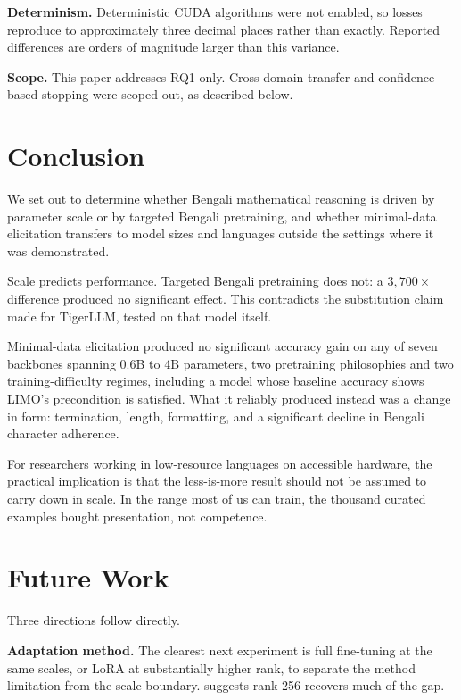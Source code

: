 \textbf{Determinism.} Deterministic CUDA algorithms were not enabled, so losses
reproduce to approximately three decimal places rather than exactly. Reported
differences are orders of magnitude larger than this variance.

\textbf{Scope.} This paper addresses RQ1 only. Cross-domain transfer and
confidence-based stopping were scoped out, as described below.


\section{Conclusion}

We set out to determine whether Bengali mathematical reasoning is driven by
parameter scale or by targeted Bengali pretraining, and whether minimal-data
elicitation transfers to model sizes and languages outside the settings where it
was demonstrated.

Scale predicts performance.  Targeted Bengali pretraining does not: a
$3{,}700\times$ difference produced no significant effect. This contradicts the
substitution claim made for TigerLLM, tested on that model itself.

Minimal-data elicitation produced no significant accuracy gain on any of seven
backbones spanning 0.6B to 4B parameters, two pretraining philosophies and two
training-difficulty regimes, including a model whose baseline accuracy shows
LIMO's precondition is satisfied. What it reliably produced instead was a change
in form: termination, length, formatting, and a significant decline in Bengali
character adherence.

For researchers working in low-resource languages on accessible hardware, the
practical implication is that the less-is-more result should not be assumed to
carry down in scale. In the range most of us can train, the thousand curated
examples bought presentation, not competence.


\section{Future Work}

Three directions follow directly.

\textbf{Adaptation method.} The clearest next experiment is full fine-tuning at
the same scales, or LoRA at substantially higher rank, to separate the method
limitation from the scale boundary. \textcite{biderman2024lora} suggests rank %
256 recovers much of the gap.

